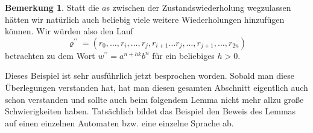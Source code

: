 \documentclass[11pt, a4paper]{article}
\theoremstyle{definition}
\newtheorem*{remark*}{Bemerkung}
\theoremstyle{plain}
\numberwithin{equation}{section}
\begin{document}
\begin{remark*}
	Statt die \( a \)s zwischen der Zustandswiederholung wegzulassen hätten wir natürlich auch beliebig viele weitere Wiederholungen hinzufügen können. Wir würden also den Lauf
	\[
		\varrho^{\prime\prime} = (r_0, \ldots, r_i, \ldots, r_j, r_{i+1} \ldots r_j, \ldots, r_{j+1}, \ldots, r_{2n})
	\]
	betrachten zu dem Wort \( w^{\prime\prime} = a^{n+hk}b^n \) für ein beliebiges \( h > 0 \).
\end{remark*}
Dieses Beispiel ist sehr ausführlich jetzt besprochen worden. Sobald man diese Überlegungen verstanden hat, hat man diesen gesamten Abschnitt eigentlich auch schon verstanden und sollte auch beim folgendem Lemma nicht mehr allzu große Schwierigkeiten haben. Tatsächlich bildet das Beispiel den Beweis des Lemmas auf einen einzelnen Automaten bzw. eine einzelne Sprache ab.
\end{document}
